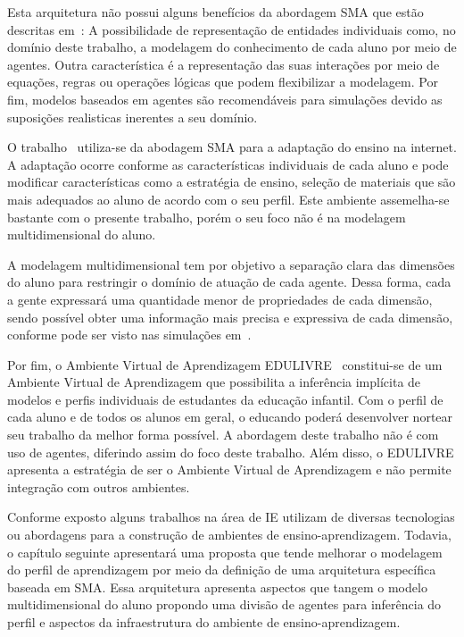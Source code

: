 Esta arquitetura não possui alguns benefícios da abordagem SMA que estão descritas em~\cite{helbing11}: A possibilidade de representação de entidades individuais como, no domínio  deste trabalho, a modelagem do conhecimento de cada aluno por meio de agentes. Outra característica é  a representação das suas interações por meio de equações, regras ou operações lógicas que podem flexibilizar a modelagem. Por fim, modelos baseados em agentes são recomendáveis para simulações devido as suposições realisticas inerentes a seu domínio.

O trabalho~\cite{geyer2001semeai} utiliza-se da abodagem SMA para a adaptação do ensino na internet. A adaptação ocorre conforme as características individuais de cada aluno e pode modificar características como a estratégia de ensino, seleção de materiais que são mais adequados ao aluno de acordo com o seu perfil. Este ambiente assemelha-se bastante com o presente trabalho, porém o seu foco não é na modelagem multidimensional do aluno.

A modelagem multidimensional tem por objetivo a separação clara das dimensões do aluno para restringir o domínio de atuação de cada agente. Dessa forma, cada a gente expressará uma quantidade menor de propriedades de cada dimensão, sendo possível obter uma informação mais precisa e expressiva de cada dimensão, conforme pode ser visto nas simulações em~\cite{helbing11}.

Por fim, o Ambiente Virtual de Aprendizagem EDULIVRE~\cite{rabelo2010identificacao} constitui-se de um Ambiente Virtual de Aprendizagem que possibilita a inferência implícita de modelos e perfis individuais de estudantes da educação infantil. Com o perfil de cada aluno e de todos os alunos em geral, o educando poderá desenvolver nortear seu trabalho da melhor forma possível. A abordagem deste trabalho não é com uso de agentes, diferindo assim do foco deste trabalho. Além disso, o EDULIVRE apresenta a estratégia de ser o Ambiente Virtual de Aprendizagem e não permite integração com outros ambientes.

Conforme exposto alguns trabalhos na área de IE utilizam de diversas tecnologias ou abordagens para a construção de ambientes de ensino-aprendizagem. Todavia, o capítulo seguinte apresentará uma proposta que tende melhorar o modelagem do perfil de aprendizagem por meio da definição de uma arquitetura específica baseada em SMA. Essa arquitetura apresenta aspectos que tangem o modelo multidimensional do aluno propondo uma divisão de agentes para inferência do perfil e aspectos da infraestrutura do ambiente de ensino-aprendizagem.














